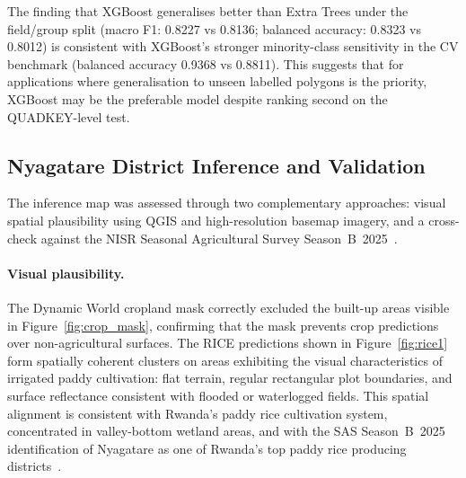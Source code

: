 The finding that XGBoost generalises better than Extra Trees under
the field/group split (macro F1: 0.8227 vs 0.8136; balanced
accuracy: 0.8323 vs 0.8012) is consistent with XGBoost's stronger
minority-class sensitivity in the CV benchmark (balanced accuracy
0.9368 vs 0.8811). This suggests that for applications where
generalisation to unseen labelled polygons is the priority,
XGBoost may be the preferable model despite ranking second on the
QUADKEY-level test.


\subsection{Nyagatare District Inference and Validation}
\label{subsec:disc_inference}

The inference map was assessed through two complementary approaches:
visual spatial plausibility using QGIS and high-resolution basemap
imagery, and a cross-check against the NISR Seasonal Agricultural
Survey Season~B~2025~\cite{nisr2025sas}.

\paragraph{Visual plausibility.}
The Dynamic World cropland mask correctly excluded the built-up
areas visible in Figure~\ref{fig:crop_mask}, confirming that the
mask prevents crop predictions over non-agricultural surfaces. The
RICE predictions shown in Figure~\ref{fig:rice1} form spatially
coherent clusters on areas exhibiting the visual characteristics
of irrigated paddy cultivation: flat terrain, regular rectangular
plot boundaries, and surface reflectance consistent with flooded
or waterlogged fields. This spatial alignment is consistent with
Rwanda's paddy rice cultivation system, concentrated in
valley-bottom wetland areas, and with the SAS Season~B~2025
identification of Nyagatare as one of Rwanda's top paddy rice
producing districts~\cite{nisr2025sas}.

